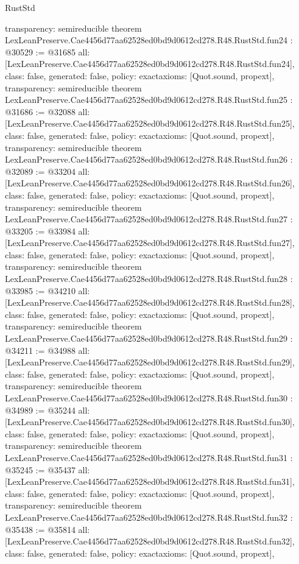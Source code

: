 \begin{lexlean}{RustStd}
\begin{coremodule}
{  transparency: semireducible
}
theorem LexLeanPreserve.Cae4456d77aa62528ed0bd9d0612cd278.R48.RustStd.fun24 : @30529 := @31685 {
  all: [LexLeanPreserve.Cae4456d77aa62528ed0bd9d0612cd278.R48.RustStd.fun24],
  class: false,
  generated: false,
  policy: exact{axioms: [Quot.sound, propext]},
  transparency: semireducible
}
theorem LexLeanPreserve.Cae4456d77aa62528ed0bd9d0612cd278.R48.RustStd.fun25 : @31686 := @32088 {
  all: [LexLeanPreserve.Cae4456d77aa62528ed0bd9d0612cd278.R48.RustStd.fun25],
  class: false,
  generated: false,
  policy: exact{axioms: [Quot.sound, propext]},
  transparency: semireducible
}
theorem LexLeanPreserve.Cae4456d77aa62528ed0bd9d0612cd278.R48.RustStd.fun26 : @32089 := @33204 {
  all: [LexLeanPreserve.Cae4456d77aa62528ed0bd9d0612cd278.R48.RustStd.fun26],
  class: false,
  generated: false,
  policy: exact{axioms: [Quot.sound, propext]},
  transparency: semireducible
}
theorem LexLeanPreserve.Cae4456d77aa62528ed0bd9d0612cd278.R48.RustStd.fun27 : @33205 := @33984 {
  all: [LexLeanPreserve.Cae4456d77aa62528ed0bd9d0612cd278.R48.RustStd.fun27],
  class: false,
  generated: false,
  policy: exact{axioms: [Quot.sound, propext]},
  transparency: semireducible
}
theorem LexLeanPreserve.Cae4456d77aa62528ed0bd9d0612cd278.R48.RustStd.fun28 : @33985 := @34210 {
  all: [LexLeanPreserve.Cae4456d77aa62528ed0bd9d0612cd278.R48.RustStd.fun28],
  class: false,
  generated: false,
  policy: exact{axioms: [Quot.sound, propext]},
  transparency: semireducible
}
theorem LexLeanPreserve.Cae4456d77aa62528ed0bd9d0612cd278.R48.RustStd.fun29 : @34211 := @34988 {
  all: [LexLeanPreserve.Cae4456d77aa62528ed0bd9d0612cd278.R48.RustStd.fun29],
  class: false,
  generated: false,
  policy: exact{axioms: [Quot.sound, propext]},
  transparency: semireducible
}
theorem LexLeanPreserve.Cae4456d77aa62528ed0bd9d0612cd278.R48.RustStd.fun30 : @34989 := @35244 {
  all: [LexLeanPreserve.Cae4456d77aa62528ed0bd9d0612cd278.R48.RustStd.fun30],
  class: false,
  generated: false,
  policy: exact{axioms: [Quot.sound, propext]},
  transparency: semireducible
}
theorem LexLeanPreserve.Cae4456d77aa62528ed0bd9d0612cd278.R48.RustStd.fun31 : @35245 := @35437 {
  all: [LexLeanPreserve.Cae4456d77aa62528ed0bd9d0612cd278.R48.RustStd.fun31],
  class: false,
  generated: false,
  policy: exact{axioms: [Quot.sound, propext]},
  transparency: semireducible
}
theorem LexLeanPreserve.Cae4456d77aa62528ed0bd9d0612cd278.R48.RustStd.fun32 : @35438 := @35814 {
  all: [LexLeanPreserve.Cae4456d77aa62528ed0bd9d0612cd278.R48.RustStd.fun32],
  class: false,
  generated: false,
  policy: exact{axioms: [Quot.sound, propext]},
}
\end{coremodule}
\end{lexlean}
